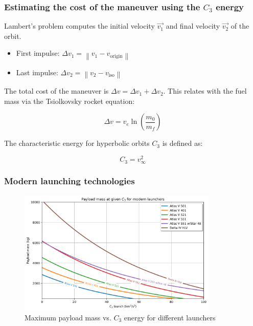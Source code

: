 \documentclass[xcolor={dvipsnames}]{beamer}
\begin{document}
\begin{frame}
\frametitle{Estimating the cost of the maneuver using the $C_3$ energy}

Lambert's problem computes the initial velocity $\vec{v_1}$ and final velocity
$\vec{v_2}$ of the orbit.

\vspace{0.25cm}
    \begin{itemize}
        \item First impulse: $\Delta v_1 = \left \|  v_{1} - v_{\text{origin}} \right \|$
        \item Last impulse: $\Delta v_2 = \left \|  v_{2} - v_{\text{iso}} \right \|$
    \end{itemize}
\vspace{0.25cm}

\pause
The total cost of the maneuver is $\Delta v = \Delta v_1 + \Delta v_2$. This
relates with the fuel mass via the Tsiolkovsky rocket equation:

$$ \Delta v = v_{e} \ln \left( \frac{m_0}{m_f} \right) $$

\pause
\vspace{0.25cm}
The characteristic energy for hyperbolic orbits $C_3$ is defined as:

$$ C_3 = v_{\infty}^2 $$

\end{frame}

\begin{frame}
\frametitle{Modern launching technologies}

\begin{figure}[h]
    \centering
    \includegraphics[width=0.85\textwidth]{fig/static/payload_vs_c3.png}
    \caption{Maximum payload mass vs. $C_3$ energy for different launchers}
    \label{fig:payload_vs_c3}
\end{figure}

\end{frame}
\end{document}
